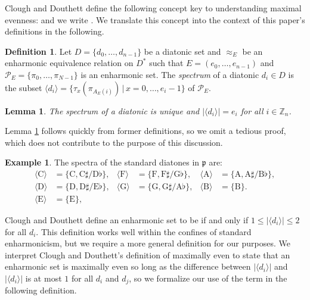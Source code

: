 \documentclass{article}
\theoremstyle{plain}
\newtheorem{lemma}[theorem]{Lemma}
\theoremstyle{definition}
\newtheorem{definition}[theorem]{Definition}
\newtheorem{example}[theorem]{Example}
\theoremstyle{remark}
\begin{document}
Clough and Douthett define the following concept key to understanding maximal evenness:  and we write  \cite{Clough_Douthett}. We translate this concept into the context of this paper's definitions in the following.

\begin{definition}
	Let $D=\{d_0,\dots,d_{n-1}\}$ be a diatonic set and $\approx_E$ be an enharmonic equivalence relation on $D^\ast$ such that $E=(e_0,\dots,e_{n-1})$ and $\mathcal{P}_E=\{\pi_0,\dots,\pi_{N-1}\}$ is an enharmonic set. The \textit{spectrum} of a diatonic $d_i\in D$ is the subset $\langle d_i\rangle=\{\tau_x(\pi_{A_E(i)})\,|\,x=0,\dots,e_i-1\}$ of $\mathcal{P}_E$.
\end{definition}

\begin{lemma}
\label{LEM.Spectrums Unique}
	The spectrum of a diatonic is unique and $|\langle d_i\rangle|=e_i$ for all $i\in\mathbb{Z}_n$.
\end{lemma}

Lemma \ref{LEM.Spectrums Unique} follows quickly from former definitions, so we omit a tedious proof, which does not contribute to the purpose of this discussion.

\begin{example}
	The spectra of the standard diatones in $\mathfrak{p}$ are: \begin{align*} \langle\textrm{C}\rangle &= \{\textrm{C},\textrm{C}\sharp/\textrm{D}\flat\}, & \langle\textrm{F}\rangle &= \{\textrm{F},\textrm{F}\sharp/\textrm{G}\flat\}, & \langle\textrm{A}\rangle &= \{\textrm{A},\textrm{A}\sharp/\textrm{B}\flat\}, \\ \langle\textrm{D}\rangle &= \{\textrm{D},\textrm{D}\sharp/\textrm{E}\flat\}, & \langle\textrm{G}\rangle &= \{\textrm{G},\textrm{G}\sharp/\textrm{A}\flat\}, & \langle\textrm{B}\rangle &= \{\textrm{B}\}. \\ \langle\textrm{E}\rangle &= \{\textrm{E}\}, \end{align*}
\end{example}

Clough and Douthett define an enharmonic set to be  if and only if $1\le|\langle d_i\rangle|\le 2$ for all $d_i$. This definition works well within the confines of standard enharmonicism, but we require a more general definition for our purposes. We interpret Clough and Douthett's definition of maximally even to state that an enharmonic set is maximally even so long as the difference between $|\langle d_i\rangle|$ and $|\langle d_i\rangle|$ is at most $1$ for all $d_i$ and $d_j$, so we formalize our use of the term  in the following definition.
\end{document}
